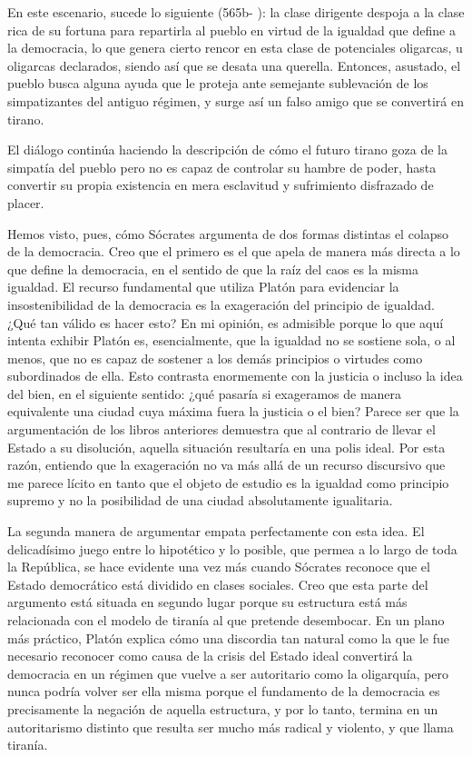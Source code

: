 En este escenario, sucede lo siguiente (565b-
): la clase dirigente despoja a la clase rica
de su fortuna para repartirla al pueblo en
virtud de la igualdad que define a la
democracia, lo que genera cierto rencor en
esta clase de potenciales oligarcas, u
oligarcas declarados, siendo así que se
desata una querella. Entonces, asustado, el
pueblo busca alguna ayuda que le proteja ante
semejante sublevación de los simpatizantes
del antiguo régimen, y surge así un falso
amigo que se convertirá en tirano.

El diálogo continúa haciendo la descripción
de cómo el futuro tirano goza de la simpatía
del pueblo pero no es capaz de controlar su
hambre de poder, hasta convertir su propia
existencia en mera esclavitud y sufrimiento
disfrazado de placer.

Hemos visto, pues, cómo Sócrates argumenta de
dos formas distintas el colapso de la
democracia. Creo que el primero es el que
apela de manera más directa a lo que define
la democracia, en el sentido de que la raíz
del caos es la misma igualdad. El recurso
fundamental que utiliza Platón para
evidenciar la insostenibilidad de la
democracia es la exageración del principio de
igualdad. ¿Qué tan válido es hacer esto? En
mi opinión, es admisible porque lo que aquí
intenta exhibir Platón es, esencialmente, que
la igualdad no se sostiene sola, o al menos,
que no es capaz de sostener a los demás
principios o virtudes como subordinados de
ella. Esto contrasta enormemente con la
justicia o incluso la idea del bien, en el
siguiente sentido: ¿qué pasaría si exageramos
de manera equivalente una ciudad cuya máxima
fuera la justicia o el bien? Parece ser que
la argumentación de los libros anteriores
demuestra que al contrario de llevar el
Estado a su disolución, aquella situación
resultaría en una polis ideal. Por esta
razón, entiendo que la exageración no va más
allá de un recurso discursivo que me parece
lícito en tanto que el objeto de estudio es
la igualdad como principio supremo y no la
posibilidad de una ciudad absolutamente
igualitaria.

La segunda manera de argumentar empata
perfectamente con esta idea. El delicadísimo
juego entre lo hipotético y lo posible, que
permea a lo largo de toda la República, se
hace evidente una vez más cuando Sócrates
reconoce que el Estado democrático está
dividido en clases sociales. Creo que esta
parte del argumento está situada en segundo
lugar porque su estructura está más
relacionada con el modelo de tiranía al que
pretende desembocar. En un plano más
práctico, Platón explica cómo una discordia
tan natural como la que le fue necesario
reconocer como causa de la crisis del Estado
ideal convertirá la democracia en un régimen
que vuelve a ser autoritario como la
oligarquía, pero nunca podría volver ser ella
misma porque el fundamento de la democracia
es precisamente la negación de aquella
estructura, y por lo tanto, termina en un
autoritarismo distinto que resulta ser mucho
más radical y violento, y que llama tiranía.

